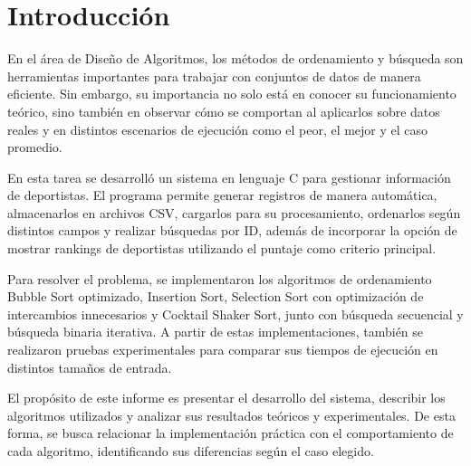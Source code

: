 \chapter{Introducción}
En el área de Diseño de Algoritmos, los métodos de ordenamiento y búsqueda son herramientas importantes para trabajar con conjuntos de datos de manera eficiente. Sin embargo, su importancia no solo está en conocer su funcionamiento teórico, sino también en observar cómo se comportan al aplicarlos sobre datos reales y en distintos escenarios de ejecución como el peor, el mejor y el caso promedio.

En esta tarea se desarrolló un sistema en lenguaje C para gestionar información de deportistas. El programa permite generar registros de manera automática, almacenarlos en archivos CSV, cargarlos para su procesamiento, ordenarlos según distintos campos y realizar búsquedas por ID, además de incorporar la opción de mostrar rankings de deportistas utilizando el puntaje como criterio principal.

Para resolver el problema, se implementaron los algoritmos de ordenamiento Bubble Sort optimizado, Insertion Sort, Selection Sort con optimización de intercambios innecesarios y Cocktail Shaker Sort, junto con búsqueda secuencial y búsqueda binaria iterativa. A partir de estas implementaciones, también se realizaron pruebas experimentales para comparar sus tiempos de ejecución en distintos tamaños de entrada.

El propósito de este informe es presentar el desarrollo del sistema, describir los algoritmos utilizados y analizar sus resultados teóricos y experimentales. De esta forma, se busca relacionar la implementación práctica con el comportamiento de cada algoritmo, identificando sus diferencias según el caso elegido.